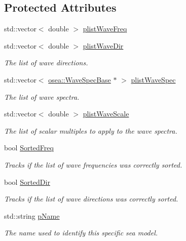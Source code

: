 \subsection*{Protected Attributes}
\begin{DoxyCompactItemize}
\item 
std\-::vector$<$ double $>$ \hyperlink{classosea_1_1_sea_model_a9dbf5842fe27aec73fe1694c837ed052}{plist\-Wave\-Freq}
\item 
std\-::vector$<$ double $>$ \hyperlink{classosea_1_1_sea_model_a3b700efb2278fad77b925f1ac39e65d5}{plist\-Wave\-Dir}
\begin{DoxyCompactList}\small\item\em The list of wave directions. \end{DoxyCompactList}\item 
std\-::vector$<$ \hyperlink{classosea_1_1_wave_spec_base}{osea\-::\-Wave\-Spec\-Base} $\ast$ $>$ \hyperlink{classosea_1_1_sea_model_a6ff2ff29955714965406a26a5f2e09b1}{plist\-Wave\-Spec}
\begin{DoxyCompactList}\small\item\em The list of wave spectra. \end{DoxyCompactList}\item 
std\-::vector$<$ double $>$ \hyperlink{classosea_1_1_sea_model_a8c099ee28555ea1ac4795a05598b6027}{plist\-Wave\-Scale}
\begin{DoxyCompactList}\small\item\em The list of scalar multiples to apply to the wave spectra. \end{DoxyCompactList}\item 
bool \hyperlink{classosea_1_1_sea_model_a55ba1a3f8d242b4c5c78a5613101dd6f}{Sorted\-Freq}
\begin{DoxyCompactList}\small\item\em Tracks if the list of wave frequencies was correctly sorted. \end{DoxyCompactList}\item 
bool \hyperlink{classosea_1_1_sea_model_a199be0a4bceaefdd36e30fcf7e4fe9f1}{Sorted\-Dir}
\begin{DoxyCompactList}\small\item\em Tracks if the list of wave directions was correctly sorted. \end{DoxyCompactList}\item 
std\-::string \hyperlink{classosea_1_1_sea_model_aea011a6daaf78caf7d008d7fd795432a}{p\-Name}
\begin{DoxyCompactList}\small\item\em The name used to identify this specific sea model. \end{DoxyCompactList}\end{DoxyCompactItemize}
